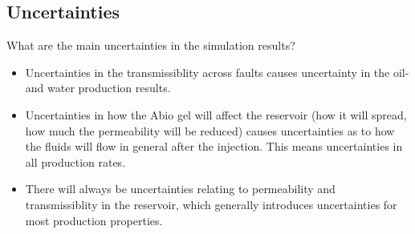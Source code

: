 \subsection{Uncertainties} %
\label{sub:uncertainties}

\begin{question}
  What are the main uncertainties in the simulation results?
\end{question}

\begin{itemize}
  \item Uncertainties in the transmissiblity across faults causes uncertainty in the oil- and water production results.
  \item Uncertainties in how the Abio gel will affect the reservoir (how it will spread, how much the permeability will be reduced) causes uncertainties as to how the fluids will flow in general after the injection. This means uncertainties in all production rates.
  \item There will always be uncertainties relating to permeability and transmissiblity in the reservoir, which generally introduces uncertainties for most production properties.
\end{itemize}




